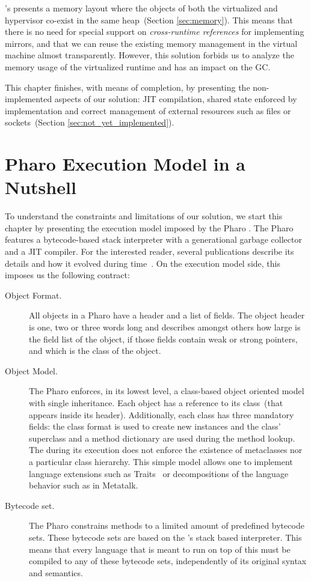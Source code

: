 \Vtt's presents a memory layout where the objects of both the virtualized and hypervisor co-exist in the same heap~(Section \ref{sec:memory}). This means that there is no need for special support on \emph{cross-runtime references} for implementing \eg mirrors, and that we can reuse the existing memory management in the virtual machine almost transparently.
However, this solution forbids us to analyze the memory usage of the virtualized runtime and has an impact on the GC.

This chapter finishes, with means of completion, by presenting the non-implemented aspects of our solution: JIT compilation, shared state enforced by \VM implementation and correct management of external resources such as files or sockets~(Section \ref{sec:not_yet_implemented}).

\section{Pharo Execution Model in a Nutshell}\label{sec:pharo_execution_model}

To understand the constraints and limitations of our solution, we start this chapter by presenting the execution model imposed by the Pharo \VM. The Pharo \VM features a bytecode-based stack interpreter with a generational garbage collector and a JIT compiler. For the interested reader, several publications describe its details and how it evolved during time~\cite{Gold83a,Inga97a,Mira11a}. On the execution model side, this \VM imposes us the following contract:

\begin{description}

\item[Object Format.] All objects in a Pharo \VM have a header and a list of fields. The object header is one, two or three words long and describes amongst others how large is the field list of the object, if those fields contain weak or strong pointers, and which is the class of the object.

\item[Object Model.] The Pharo \VM enforces, in its lowest level, a class-based object oriented model with single inheritance. Each object has a reference to its class~(that appears inside its header). Additionally, each class has three mandatory fields: the class format is used to create new instances and the class' superclass and a method dictionary are used during the method lookup. The \VM during its execution does not enforce the existence of metaclasses nor a particular class hierarchy. This simple model allows one to implement language extensions such as Traits~\cite{Scha03a} or decompositions of the language behavior such as in Metatalk\cite{Papo11a}.

\item[Bytecode set.] The Pharo \VM constrains methods to a limited amount of predefined bytecode sets. These bytecode sets are based on the \VM's stack based interpreter. This means that every language that is meant to run on top of this \VM must be compiled to any of these bytecode sets, independently of its original syntax and semantics. 

\end{description}

